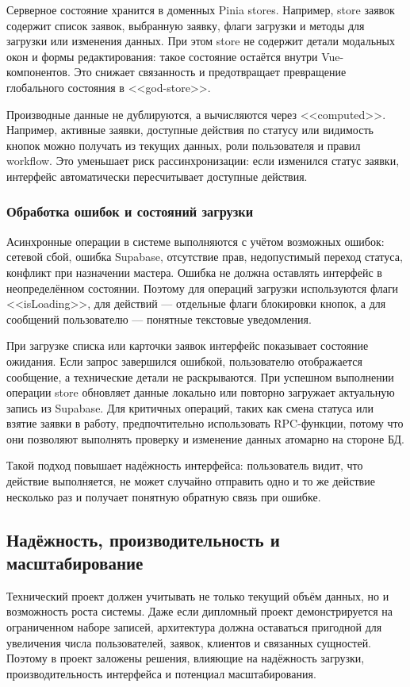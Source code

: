 Серверное состояние хранится в доменных Pinia stores. Например, store заявок содержит список заявок, выбранную заявку, флаги загрузки и методы для загрузки или изменения данных. При этом store не содержит детали модальных окон и формы редактирования: такое состояние остаётся внутри Vue-компонентов. Это снижает связанность и предотвращает превращение глобального состояния в <<god-store>>.

Производные данные не дублируются, а вычисляются через <<computed>>. Например, активные заявки, доступные действия по статусу или видимость кнопок можно получать из текущих данных, роли пользователя и правил workflow. Это уменьшает риск рассинхронизации: если изменился статус заявки, интерфейс автоматически пересчитывает доступные действия.

\subsubsection{Обработка ошибок и состояний загрузки}

Асинхронные операции в системе выполняются с учётом возможных ошибок: сетевой сбой, ошибка Supabase, отсутствие прав, недопустимый переход статуса, конфликт при назначении мастера. Ошибка не должна оставлять интерфейс в неопределённом состоянии. Поэтому для операций загрузки используются флаги <<isLoading>>, для действий — отдельные флаги блокировки кнопок, а для сообщений пользователю — понятные текстовые уведомления.

При загрузке списка или карточки заявок интерфейс показывает состояние ожидания. Если запрос завершился ошибкой, пользователю отображается сообщение, а технические детали не раскрываются. При успешном выполнении операции store обновляет данные локально или повторно загружает актуальную запись из Supabase. Для критичных операций, таких как смена статуса или взятие заявки в работу, предпочтительно использовать RPC-функции, потому что они позволяют выполнять проверку и изменение данных атомарно на стороне БД.

Такой подход повышает надёжность интерфейса: пользователь видит, что действие выполняется, не может случайно отправить одно и то же действие несколько раз и получает понятную обратную связь при ошибке.

\subsection{Надёжность, производительность и масштабирование}

Технический проект должен учитывать не только текущий объём данных, но и возможность роста системы. Даже если дипломный проект демонстрируется на ограниченном наборе записей, архитектура должна оставаться пригодной для увеличения числа пользователей, заявок, клиентов и связанных сущностей. Поэтому в проект заложены решения, влияющие на надёжность загрузки, производительность интерфейса и потенциал масштабирования.

